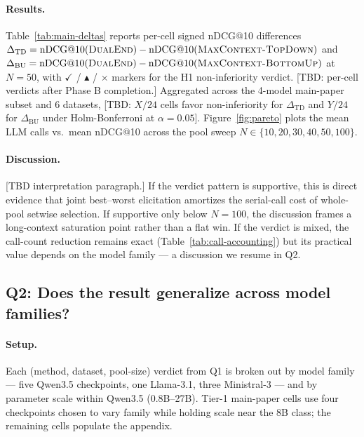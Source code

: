 \paragraph{Results.}
Table~\ref{tab:main-deltas} reports per-cell signed nDCG@10 differences $\Delta_{\mathrm{TD}} = \mathrm{nDCG@10}(\textsc{DualEnd}) - \mathrm{nDCG@10}(\textsc{MaxContext-TopDown})$ and $\Delta_{\mathrm{BU}} = \mathrm{nDCG@10}(\textsc{DualEnd}) - \mathrm{nDCG@10}(\textsc{MaxContext-BottomUp})$ at $N{=}50$, with $\checkmark$ / $\blacktriangle$ / $\times$ markers for the H1 non-inferiority verdict. [TBD: per-cell verdicts after Phase B completion.] Aggregated across the 4-model main-paper subset and 6 datasets, [TBD: $X/24$ cells favor non-inferiority for $\Delta_{\mathrm{TD}}$ and $Y/24$ for $\Delta_{\mathrm{BU}}$ under Holm-Bonferroni at $\alpha{=}0.05$]. Figure~\ref{fig:pareto} plots the mean LLM calls vs.\ mean nDCG@10 across the pool sweep $N \in \{10,20,30,40,50,100\}$.




\paragraph{Discussion.}
[TBD interpretation paragraph.] If the verdict pattern is supportive, this is direct evidence that joint best--worst elicitation amortizes the serial-call cost of whole-pool setwise selection. If supportive only below $N{=}100$, the discussion frames a long-context saturation point rather than a flat win. If the verdict is mixed, the call-count reduction remains exact (Table~\ref{tab:call-accounting}) but its practical value depends on the model family --- a discussion we resume in Q2.

\subsection{Q2: Does the result generalize across model families?}
\label{sec:results-family}

\paragraph{Setup.}
Each (method, dataset, pool-size) verdict from Q1 is broken out by model family --- five Qwen3.5 checkpoints, one Llama-3.1, three Ministral-3 --- and by parameter scale within Qwen3.5 (0.8B--27B). Tier-1 main-paper cells use four checkpoints chosen to vary family while holding scale near the 8B class; the remaining cells populate the appendix.

